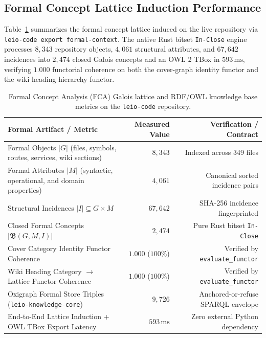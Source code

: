 \documentclass[11pt]{article}
\begin{document}
\subsection{Formal Concept Lattice Induction Performance}

Table~\ref{tab:lattice-stats} summarizes the formal concept lattice induced on the live repository via \texttt{leio-code export formal-context}. The native Rust bitset \texttt{In-Close} engine processes $8{,}343$ repository objects, $4{,}061$ structural attributes, and $67{,}642$ incidences into $2{,}474$ closed Galois concepts and an OWL 2 TBox in $593\,\text{ms}$, verifying $1.000$ functorial coherence on both the cover-graph identity functor and the wiki heading hierarchy functor.

\begin{table}[t]
\centering
\caption{Formal Concept Analysis (FCA) Galois lattice and RDF/OWL knowledge base metrics on the \texttt{leio-code} repository.}
\label{tab:lattice-stats}
\small
\begin{tabular}{@{}lrr@{}}
\toprule
\textbf{Formal Artifact / Metric} & \textbf{Measured Value} & \textbf{Verification / Contract} \\
\midrule
Formal Objects $|G|$ (files, symbols, routes, services, wiki sections) & $8{,}343$ & Indexed across 349 files \\
Formal Attributes $|M|$ (syntactic, operational, and domain properties) & $4{,}061$ & Canonical sorted incidence pairs \\
Structural Incidences $|I| \subseteq G \times M$ & $67{,}642$ & SHA-256 incidence fingerprinted \\
Closed Formal Concepts $|\mathfrak{B}(G, M, I)|$ & $2{,}474$ & Pure Rust bitset \texttt{In-Close} \\
Cover Category Identity Functor Coherence & $1.000$ ($100\%$) & Verified by \texttt{evaluate\_functor} \\
Wiki Heading Category $\to$ Lattice Functor Coherence & $1.000$ ($100\%$) & Verified by \texttt{evaluate\_functor} \\
Oxigraph Formal Store Triples (\texttt{leio-knowledge-core}) & $9{,}726$ & Anchored-or-refuse SPARQL envelope \\
End-to-End Lattice Induction + OWL TBox Export Latency & $593\,\text{ms}$ & Zero external Python dependency \\
\bottomrule
\end{tabular}
\end{table}
\end{document}
